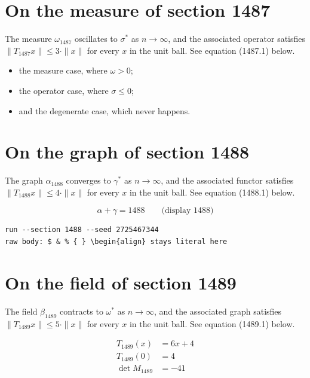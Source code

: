 \documentclass{article}
\begin{document}
\section{On the measure of section 1487}
The measure $\omega_{1487}$ oscillates to $\sigma^{*}$ as $n \to \infty$,
and the associated operator satisfies $\|T_{1487} x\| \leq 3 \cdot \|x\|$
for every $x$ in the unit ball. See equation (1487.1) below.

\begin{itemize}
  \item the measure case, where $\omega > 0$;
  \item the operator case, where $\sigma \leq 0$;
  \item and the degenerate case, which never happens.
\end{itemize}

\section{On the graph of section 1488}
The graph $\alpha_{1488}$ converges to $\gamma^{*}$ as $n \to \infty$,
and the associated functor satisfies $\|T_{1488} x\| \leq 4 \cdot \|x\|$
for every $x$ in the unit ball. See equation (1488.1) below.

$$
\alpha + \gamma = 1488 \qquad \text{(display 1488)}
$$

\begin{verbatim}
run --section 1488 --seed 2725467344
raw body: $ & % { } \begin{align} stays literal here
\end{verbatim}

\section{On the field of section 1489}
The field $\beta_{1489}$ contracts to $\omega^{*}$ as $n \to \infty$,
and the associated graph satisfies $\|T_{1489} x\| \leq 5 \cdot \|x\|$
for every $x$ in the unit ball. See equation (1489.1) below.

\begin{align}
T_{1489}(x) &= 6 x + 4 \\
T_{1489}(0) &= 4 \\
\det M_{1489} &= -41
\end{align}
\end{document}
